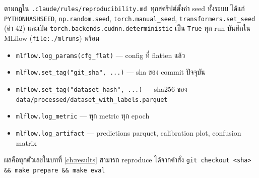 ตามกฎใน \texttt{.claude/rules/reproducibility.md}\ ทุกสคริปต์ตั้งค่า
seed ทั้งระบบ ได้แก่ \texttt{PYTHONHASHSEED}, \texttt{np.random.seed},
\texttt{torch.manual\_seed}, \texttt{transformers.set\_seed} (ค่า 42)
และเปิด \texttt{torch.backends.cudnn.deterministic} เป็น \texttt{True}
ทุก run บันทึกใน MLflow (\texttt{file:./mlruns}) พร้อม
\begin{itemize}[leftmargin=2em]
  \item \texttt{mlflow.log\_params(cfg\_flat)} — config ที่ flatten แล้ว
  \item \texttt{mlflow.set\_tag("git\_sha", ...)} — sha ของ commit ปัจจุบัน
  \item \texttt{mlflow.set\_tag("dataset\_hash", ...)} — sha256 ของ
        \texttt{data/processed/dataset\_with\_labels.parquet}
  \item \texttt{mlflow.log\_metric} — ทุก metric ทุก epoch
  \item \texttt{mlflow.log\_artifact} — predictions parquet, calibration
        plot, confusion matrix
\end{itemize}
ผลคือทุกตัวเลขในบทที่ \ref{ch:results} สามารถ reproduce ได้จากคำสั่ง
\texttt{git checkout <sha> \&\& make prepare \&\& make eval}
